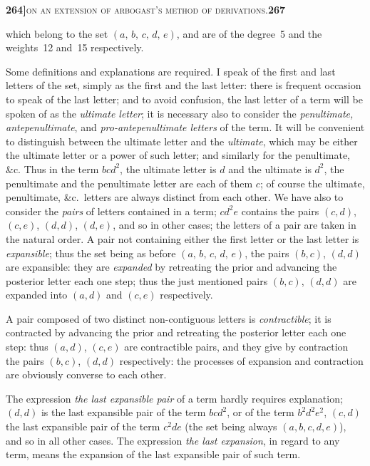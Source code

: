 \documentclass[11pt]{article}
\begin{document}
\newpage
\setcounter{page}{267}

\noindent\textbf{264]}\hfill\textsc{on an extension of arbogast's method of derivations.}\hfill\textbf{267}

\medskip

\noindent which belong to the set $(a,\,b,\,c,\,d,\,e)$, and are of the degree~5 and the weights~12 and~15 respectively.

\medskip

\noindent Some definitions and explanations are required. I speak of the first and last letters of the set, simply as the first and the last letter: there is frequent occasion to speak of the last letter; and to avoid confusion, the last letter of a term will be spoken of as the \textit{ultimate letter}; it is necessary also to consider the \textit{penultimate, antepenultimate}, and \textit{pro-antepenultimate letters} of the term. It will be convenient to distinguish between the ultimate letter and the \textit{ultimate}, which may be either the ultimate letter or a power of such letter; and similarly for the penultimate, \&c. Thus in the term $b c d^2$, the ultimate letter is $d$ and the ultimate is $d^2$, the penultimate and the penultimate letter are each of them $c$; of course the ultimate, penultimate, \&c.\ letters are always distinct from each other. We have also to consider the \textit{pairs} of letters contained in a term; $c d^2 e$ contains the pairs $(c, d)$, $(c, e)$, $(d, d)$, $(d, e)$, and so in other cases; the letters of a pair are taken in the natural order. A pair not containing either the first letter or the last letter is \textit{expansible}; thus the set being as before $(a,\,b,\,c,\,d,\,e)$, the pairs $(b, c)$, $(d, d)$ are expansible: they are \textit{expanded} by retreating the prior and advancing the posterior letter each one step; thus the just mentioned pairs $(b, c)$, $(d, d)$ are expanded into $(a, d)$ and $(c, e)$ respectively.

\medskip

\noindent A pair composed of two distinct non-contiguous letters is \textit{contractible}; it is contracted by advancing the prior and retreating the posterior letter each one step: thus $(a, d)$, $(c, e)$ are contractible pairs, and they give by contraction the pairs $(b, c)$, $(d, d)$ respectively: the processes of expansion and contraction are obviously converse to each other.

\medskip

\noindent The expression \textit{the last expansible pair} of a term hardly requires explanation; $(d, d)$ is the last expansible pair of the term $b c d^2$, or of the term $b^2 d^2 e^2$, $(c, d)$ the last expansible pair of the term $c^2 d e$ (the set being always $(a, b, c, d, e)$), and so in all other cases. The expression \textit{the last expansion}, in regard to any term, means the expansion of the last expansible pair of such term.
\end{document}
